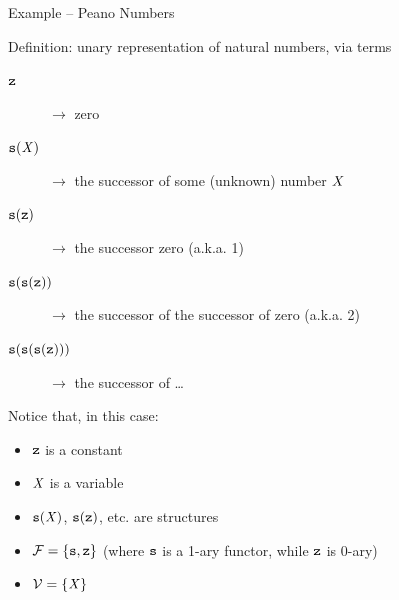 \documentclass[presentation]{beamer}\mode<presentation>{\usetheme{AMSBolognaFC}}
\begin{document}
\begin{frame}[allowframebreaks]{Example -- Peano Numbers}
    \begin{exampleblock}{Definition: unary representation of natural numbers, via terms}
        \begin{description}
            \item[$\mathtt{z}$] $\rightarrow$ zero
            \item[$\mathtt{s}(\mathit{X})$] $\rightarrow$ the successor of some (unknown) number $\mathit{X}$
            \item[$\mathtt{s}(\mathtt{z})$] $\rightarrow$ the successor zero (a.k.a. 1)
            \item[$\mathtt{s}(\mathtt{s}(\mathtt{z}))$] $\rightarrow$ the successor of the successor of zero (a.k.a. 2)
            \item[$\mathtt{s}(\mathtt{s}(\mathtt{s}(\mathtt{z})))$] $\rightarrow$ the successor of \ldots
        \end{description}
    \end{exampleblock}
    \begin{exampleblock}{Notice that, in this case:}
        \begin{itemize}
            \item $\mathtt{z}$ is a constant
            \item $\mathit{X}$ is a variable
            \item $\mathtt{s}(\mathit{X})$, $\mathtt{s}(\mathtt{z})$, etc. are structures
            \item $\mathcal{F} = \{ \mathtt{s}, \mathtt{z} \}$ \hfill {\footnotesize(where $\mathtt{s}$ is a 1-ary functor, while $\mathtt{z}$ is 0-ary)}
            \item $\mathcal{V} = \{ \mathit{X} \}$
        \end{itemize}
    \end{exampleblock}
\end{frame}
\end{document}
